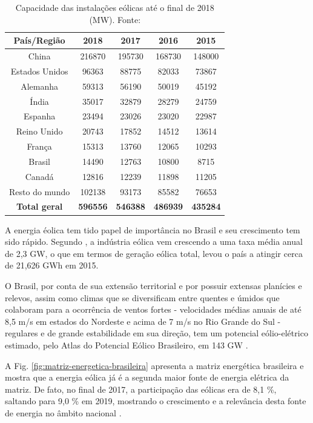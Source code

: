 \begin{table}[h]
	\centering
	\caption{Capacidade das instalações eólicas até o final de 2018 (MW). Fonte: \cite{WEI}}
	\label{tab:capacidade-instalada}
	
	\begin{tabular}{ccccc}
		\toprule
		\textbf{País/Região} & \textbf{2018} & \textbf{2017} & \textbf{2016} & \textbf{2015}\\
		\midrule
		China & 216870 & 195730 & 168730 & 148000 \\
		Estados Unidos & 96363 & 88775 & 82033 & 73867 \\
		Alemanha & 59313 & 56190 & 50019 & 45192 \\
		Índia & 35017 & 32879 & 28279 & 24759 \\
		Espanha & 23494 & 23026 & 23020 & 22987 \\
		Reino Unido & 20743 & 17852 & 14512 & 13614 \\
		França & 15313 & 13760 & 12065 & 10293 \\
        Brasil & 14490 & 12763 & 10800 & 8715 \\
        Canadá & 12816 & 12239 & 11898 & 11205 \\
        Resto do mundo & 102138 & 93173 & 85582 & 76653 \\
        \textbf{Total geral} & \textbf{596556} & \textbf{546388} & \textbf{486939} & \textbf{435284} \\
		\bottomrule
	\end{tabular}
\end{table}


A energia éolica tem tido papel de importância no Brasil e seu crescimento tem sido rápido. 
Segundo \cite{Pinto2019}, a indústria eólica vem crescendo a uma taxa média anual de 2,3 GW, o que em termos de geração eólica total, levou o país a atingir cerca de 21,626 GWh em 2015.

O Brasil, por conta de sua extensão territorial e por possuir extensas planícies e relevos, 
assim como climas que se diversificam entre quentes e úmidos que colaboram para a ocorrência de ventos fortes 
- velocidades médias anuais de até 8,5 m/s em estados do Nordeste e acima de 7 m/s no Rio Grande do Sul - 
regulares e de grande estabilidade em sua direção, tem um potencial eólio-elétrico estimado, pelo Atlas do Potencial Eólico Brasileiro, em 143 GW \cite{Pinto2019}.

A Fig. \ref{fig:matriz-energetica-brasileira} apresenta a matriz energética brasileira e mostra que a energia eólica já é a segunda maior fonte de energia elétrica da matriz. 
De fato, no final de 2017, a participação das eólicas era de 8,1 \%, saltando para 9,0 \% em 2019, mostrando o crescimento e a relevância desta fonte de energia no âmbito nacional \cite{ABEeolica}.

